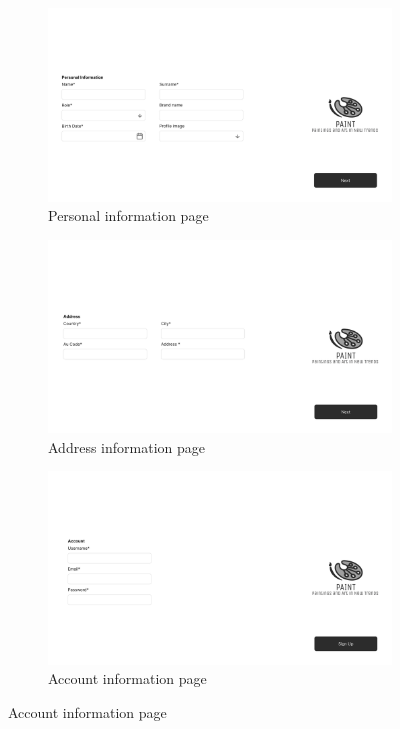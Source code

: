 \begin{figure}[H]
    \centering
\begin{subfigure}[b]{\myfigwidth}
    \centering
    \includegraphics[width=\textwidth]{images/interface_mockups/Landing page - sign up - personal information.pdf}
    \caption{Personal information page}
\end{subfigure}
\begin{subfigure}[b]{\myfigwidth}
    \centering
    \includegraphics[width=\textwidth]{images/interface_mockups/Landing page - sign up - address information.pdf}
    \caption{Address information page}
\end{subfigure}
\begin{subfigure}[b]{\myfigwidth}
    \centering
    \includegraphics[width=\textwidth]{images/interface_mockups/Landing page - sign up - account information.pdf}
    \caption{Account information page}
\end{subfigure}
\end{figure}



